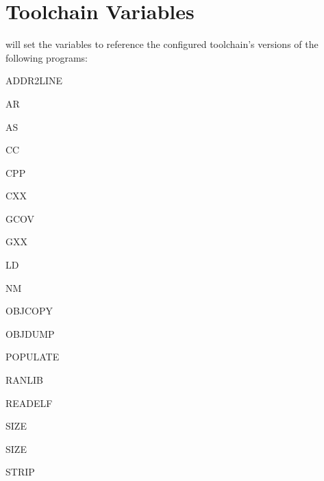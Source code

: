 \section{Toolchain Variables}

\lmsbw will set the \makefile variables to reference the configured
toolchain's versions of the following programs:

\begin{description}
\item{ADDR2LINE}
\item{AR}
\item{AS}
\item{CC}
\item{CPP}
\item{CXX}
\item{GCOV}
\item{GXX}
\item{LD}
\item{NM}
\item{OBJCOPY}
\item{OBJDUMP}
\item{POPULATE}
\item{RANLIB}
\item{READELF}
\item{SIZE}
\item{SIZE}
\item{STRIP}
\end{description}
